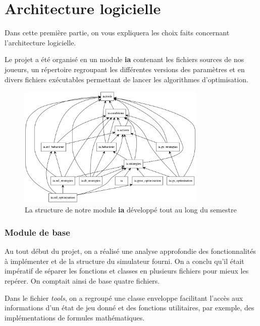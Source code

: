 \documentclass[12pt,a4paper]{article}
\begin{document}
\newpage

\part{Architecture logicielle} %
Dans cette premi\`ere partie, on vous expliquera les choix faits 
concernant l'architecture logicielle.

Le projet a \'et\'e organis\'e en un module {\bfseries ia} 
contenant les fichiers sources de nos joueurs, un r\'epertoire regroupant les 
diff\'erentes versions des param\`etres et en divers fichiers ex\'ecutables 
permettant de lancer les algorithmes d'optimisation.

\begin{figure}[!h]
  \centering
  \captionsetup{justification=centering}
  \includegraphics[width=0.8\textwidth]{packages_IA}
  \caption[La structure du module]{La structure de notre module {\bfseries ia} 
	d\'evelopp\'e tout au long du semestre}
  \label{fig:diag_classes}
\end{figure}

\section{Module de base}
Au tout d\'ebut du projet, on a r\'ealis\'e une analyse approfondie des 
fonctionnalit\'es \`a impl\'ementer et de la structure du simulateur fourni. On 
a conclu qu'il \'etait imp\'eratif de s\'eparer les fonctions et classes en 
plusieurs fichiers pour mieux les rep\'erer. On comptait ainsi de base 
quatre fichiers.

Dans le fichier {\itshape tools}, on a regroup\'e une classe enveloppe 
facilitant l'acc\`es aux informations d'un \'etat de jeu donn\'e et des 
fonctions utilitaires, par exemple, des impl\'ementations de formules 
math\'ematiques.
\end{document}

